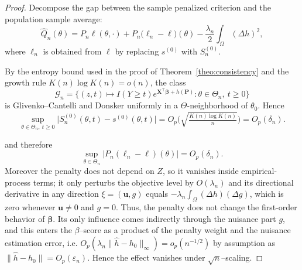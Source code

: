 \documentclass[11pt]{article}
\begin{document}
\begin{proof}
		Decompose the gap between the sample penalized criterion and the population sample average:
		\[
		\hat Q_n(\theta)
		= P_n \ell(\theta,\cdot)
		+ P_n\big(\ell_n-\ell\big)(\theta)
		- \frac{\lambda_n}{2}\!\int_\Omega(\Delta h)^2 ,
		\]
		where $\ell_n$ is obtained from $\ell$ by replacing $s^{(0)}$ with $S_n^{(0)}$. %
		
		
		By the entropy bound used in the proof of Theorem~\ref{theo:consistency} and the growth rule $K(n)\log K(n)=o(n)$, the class
		\[
		\mathcal G_n=\Big\{(z,t)\mapsto I(Y\ge t)e^{\bm X^\top\bm\beta+h(\bm P)}:
		\theta\in\Theta_n,\ t\ge 0\Big\}
		\]
		is Glivenko–Cantelli and Donsker uniformly in a $\Theta$-neighborhood of $\theta_0$. Hence
		\begin{equation}\label{eq:Sn-s0-rate}
			\sup_{\theta\in\Theta_n,\ t\ge 0}
			\big|S_n^{(0)}(\theta,t)-s^{(0)}(\theta,t)\big|
			= O_p\!\Big(\sqrt{\tfrac{K(n)\log K(n)}{n}}\Big)
			= O_p(\delta_n).
		\end{equation}
		
		and therefore 
		\begin{equation}\label{eq:Rn-small}
			\sup_{\theta\in\Theta_n}
			\big|P_n(\ell_n-\ell)(\theta)\big|=O_p(\delta_n).
		\end{equation}
		Moreover the penalty does not depend on $Z$, so it vanishes inside empirical-process terms; it only perturbs the objective level by $O(\lambda_n)$ and its directional derivative in any direction $\xi=(\bm u,g)$ equals $-\lambda_n\!\int_\Omega (\Delta h)(\Delta g)$, which is {zero whenever $\bm u\neq 0$ and $g=0$}. Thus, the penalty does not change the first-order behavior of $\bm\beta$. Its only influence comes indirectly through the nuisance part $g$, and this enters the $\beta$–score as a product of the penalty weight and the nuisance estimation error, i.e. 	 $O_p(\lambda_n \|\hat h - h_0\|_{\infty}) = o_p(n^{-1/2})$ by assumption as $\|\hat h - h_0\| = O_p(\varepsilon_n)$. Hence the effect vanishes under $\sqrt n$–scaling.
		

\end{proof}
\end{document}
